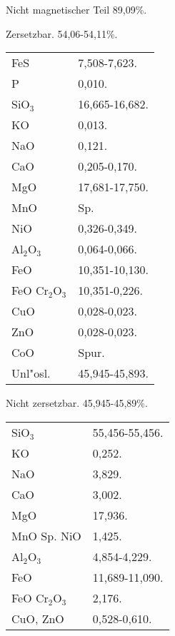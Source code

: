 \documentclass[a4paper, 11pt, oneside]{article}
\begin{document}
\begin{center}
Nicht magnetischer Teil 89,09\%.
\end{center}

\begin{center}
Zersetzbar. 54,06-54,11\%.
\end{center}

\begin{table}[H]
    \centering\swabfamily\Large
    \begin{tabular}{l l}
        FeS & 7,508-7,623. \\
        P & 0,010. \\
        SiO$_{3}$ & 16,665-16,682. \\
        KO & 0,013. \\
        NaO & 0,121. \\
        CaO & 0,205-0,170. \\
        MgO & 17,681-17,750. \\
        MnO & Sp. \\
        NiO & 0,326-0,349. \\
        Al$_{2}$O$_{3}$ & 0,064-0,066. \\
        FeO & 10,351-10,130. \\
        FeO Cr$_{2}$O$_{3}$ & 10,351-0,226. \\
        CuO & 0,028-0,023. \\
        ZnO & 0,028-0,023. \\
        CoO & Spur. \\
        Unl"osl. & 45,945-45,893. \\
    \end{tabular}
\end{table}

\begin{center}
Nicht zersetzbar. 45,945-45,89\%.
\end{center}

\begin{table}[H]
    \centering\swabfamily\Large
    \begin{tabular}{l l}
        SiO$_{3}$ & 55,456-55,456. \\
        KO & 0,252. \\
        NaO & 3,829. \\
        CaO & 3,002. \\
        MgO & 17,936. \\
        MnO Sp. NiO & 1,425. \\
        Al$_{2}$O$_{3}$ & 4,854-4,229. \\
        FeO & 11,689-11,090. \\
        FeO Cr$_{2}$O$_{3}$ & 2,176. \\
        CuO, ZnO & 0,528-0,610. \\
    \end{tabular}
\end{table}
\end{document}
